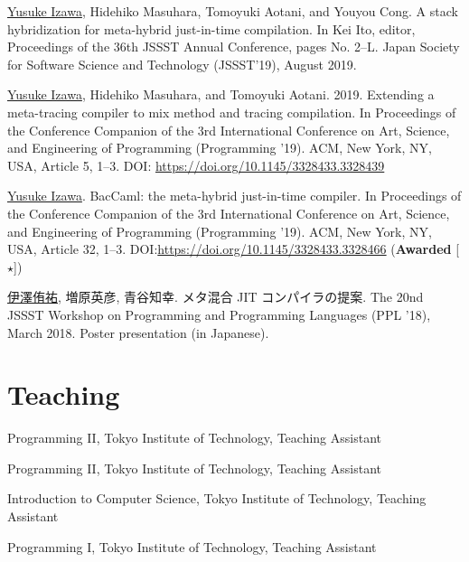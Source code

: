 \documentclass[11pt]{article} %
\newcommand{\YusukeIzawa}{\underline{Yusuke Izawa}}
\newcommand{\伊澤侑祐}{\underline{伊澤侑祐}}
\newcommand{\jit}{\textsc{JIT} }
\begin{document}
 \YusukeIzawa, Hidehiko Masuhara, Tomoyuki Aotani, and Youyou
Cong. A stack hybridization for meta-hybrid just-in-time compilation. In Kei
Ito, editor, Proceedings of the 36th JSSST Annual Conference, pages
No. 2–L. Japan Society for Software Science and Technology (JSSST'19), August
2019.
\medskip

 \YusukeIzawa, Hidehiko Masuhara, and Tomoyuki
Aotani. 2019. Extending a meta-tracing compiler to mix method and tracing
compilation. In Proceedings of the Conference Companion of the 3rd International
Conference on Art, Science, and Engineering of Programming (Programming
’19). ACM, New York, NY, USA, Article 5, 1–3. DOI:
\url{https://doi.org/10.1145/3328433.3328439}
\medskip

 \YusukeIzawa. BacCaml: the meta-hybrid just-in-time compiler. In
Proceedings of the Conference Companion of the 3rd International Conference on
Art, Science, and Engineering of Programming (Programming ’19). ACM, New York,
NY, USA, Article 32, 1–3. DOI:\url{https://doi.org/10.1145/3328433.3328466}
(\textbf{Awarded} [$\star$])

\medskip


 \伊澤侑祐, 増原英彦, 青谷知幸. メタ混合 \jit コンパイラの提案. The
20nd JSSST Workshop on Programming and Programming Languages (PPL '18), March
2018. Poster presentation (in Japanese).
\medskip


\section*{Teaching}

 Programming II, Tokyo Institute of Technology, Teaching Assistant

 Programming II, Tokyo Institute of Technology, Teaching Assistant

 Introduction to Computer Science, Tokyo Institute of Technology, Teaching Assistant

 Programming I, Tokyo Institute of Technology, Teaching Assistant
\end{document}
